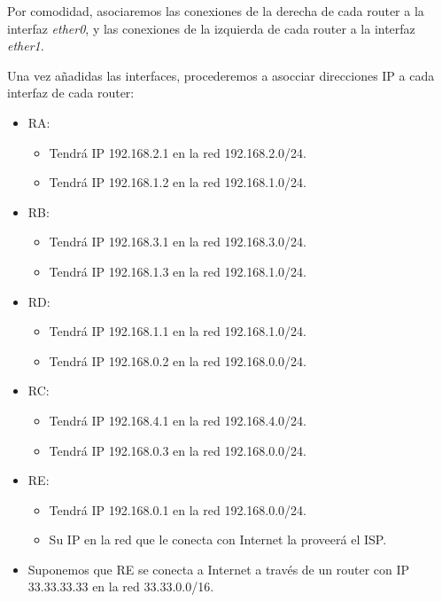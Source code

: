 \begin{ejercicio}
    Por comodidad, asociaremos las conexiones de la derecha de cada router a la interfaz \textit{ether0}, y las conexiones de la izquierda de cada router a la interfaz \textit{ether1}.

    Una vez añadidas las interfaces, procederemos a asocciar direcciones IP a cada interfaz de cada router:
    \begin{itemize}
        \item RA\@:
            \begin{itemize}
                \item Tendrá IP 192.168.2.1 en la red 192.168.2.0/24.
                \item Tendrá IP 192.168.1.2 en la red 192.168.1.0/24.
            \end{itemize}
        \item RB\@:
            \begin{itemize}
                \item Tendrá IP 192.168.3.1 en la red 192.168.3.0/24.
                \item Tendrá IP 192.168.1.3 en la red 192.168.1.0/24.
            \end{itemize}
        \item RD\@:
            \begin{itemize}
                \item Tendrá IP 192.168.1.1 en la red 192.168.1.0/24.
                \item Tendrá IP 192.168.0.2 en la red 192.168.0.0/24.
            \end{itemize}
        \item RC\@: 
            \begin{itemize}
                \item Tendrá IP 192.168.4.1 en la red 192.168.4.0/24.
                \item Tendrá IP 192.168.0.3 en la red 192.168.0.0/24.
            \end{itemize}
        \item RE\@:
            \begin{itemize}
                \item Tendrá IP 192.168.0.1 en la red 192.168.0.0/24.
                \item Su IP en la red que le conecta con Internet la proveerá el ISP\@.
            \end{itemize}
        \item Suponemos que RE se conecta a Internet a través de un router con IP 33.33.33.33 en la red 33.33.0.0/16.

\end{itemize}
\end{ejercicio}
